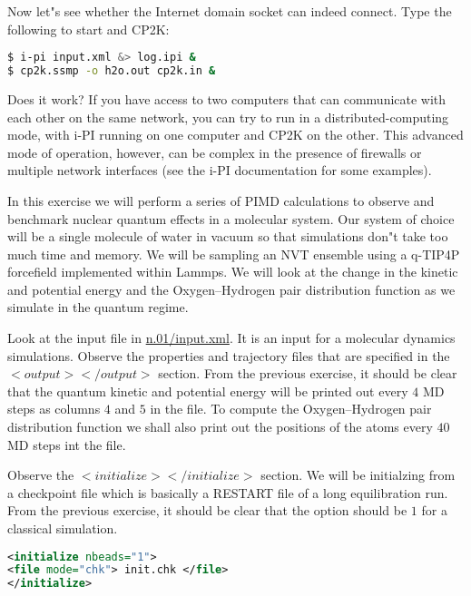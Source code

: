 \documentclass{article}
\begin{document}
\begin{Exercise}[label={inputs},title={Keywords, outputs, and units of \ipi{}}]
\Question
Now let"s see whether the Internet domain socket can indeed connect.
Type the following to start \ipi{} and CP2K:
\begin{lstlisting}[language=bash]
$ i-pi input.xml &> log.ipi &
$ cp2k.ssmp -o h2o.out cp2k.in &
\end{lstlisting}
Does it work? If you have access to two computers that can communicate with each
other on the same network, you can try to run in a distributed-computing mode,
with i-PI running on one computer and CP2K on the other. This advanced mode of 
operation, however, can be complex in the presence of firewalls or multiple 
network interfaces (see the i-PI documentation for some examples). 

\end{Exercise}

\begin{Exercise}[label={water},title={Benchmark of quantum effects in a water molecule}]
\noindent In this exercise we will perform a series of PIMD calculations to observe and benchmark nuclear quantum effects in a molecular system. Our system of choice will be a single molecule of water in vacuum so that simulations don"t take too much time and memory. We will be sampling an NVT ensemble using a q-TIP4P forcefield implemented within Lammps. We will look at the change in the kinetic and potential energy and the Oxygen--Hydrogen pair distribution function as we simulate in the quantum regime.

\Question
Look at the \ipi{} input file in \url{n.01/input.xml}. It is an \ipi{} input for a molecular dynamics simulations. Observe the 
properties and trajectory files that are specified in the \lstinxml$<output></output>$ section. From the previous exercise, 
it should be clear that the quantum kinetic and potential energy will be printed out every $4$ MD steps as columns $4$ and $5$ in the  file. To compute the Oxygen--Hydrogen pair distribution function we shall also print out the positions of the atoms every $40$ MD steps int the  file.

\Question
Observe the \lstinxml$<initialize></initialize>$ section. We will be initialzing from a checkpoint file 
 which is basically a RESTART file of a long equilibration run. 
From the previous exercise, it should be clear that the option  should be $1$ for a classical simulation.

\begin{lstlisting}[language=xml]
<initialize nbeads="1">  
<file mode="chk"> init.chk </file>
</initialize>
\end{lstlisting}


\end{Exercise}
\end{document}
